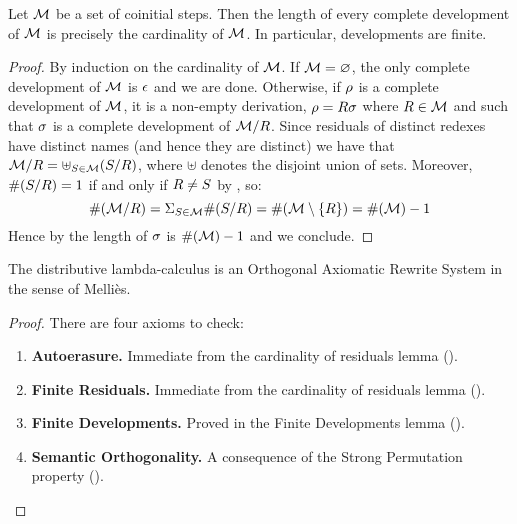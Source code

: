 \begin{lemma}
Let $\mathcal{M}$ be a set of coinitial steps.
Then the length of every complete development of $\mathcal{M}$
is precisely the cardinality of $\mathcal{M}$.
In particular, developments are finite.
\end{lemma}
\begin{proof}
By induction on the cardinality of $\mathcal{M}$.
If $\mathcal{M} = \varnothing$, the only complete development of $\mathcal{M}$ is $\epsilon$ and we are done.
Otherwise, if $\rho$ is a complete development of $\mathcal{M}$, it is a non-empty derivation, \ie
$\rho = R\sigma$
where $R \in \mathcal{M}$
and such that $\sigma$ is a complete development of $\mathcal{M}/R$.
Since residuals of distinct redexes have distinct names (and hence they are distinct)
we have that
$
  \mathcal{M}/R = \uplus_{S \in \mathcal{M}} (S/R)
$,
where $\uplus$ denotes the disjoint union of sets.
Moreover, $\#(S/R) = 1$ if and only if $R \neq S$
by , so:
\[
  \#(\mathcal{M}/R) =
  \Sigma_{S \in \mathcal{M}} \#(S/R) =
  \#(\mathcal{M} \setminus \{R\}) =
  \#(\mathcal{M}) - 1
\]
Hence by \ih the length of $\sigma$ is $\#(\mathcal{M}) - 1$
and we conclude.
\end{proof}

\begin{proposition}
The distributive lambda-calculus is an Orthogonal Axiomatic Rewrite System
in the sense of Melli\`es.
\end{proposition}
\begin{proof}
There are four axioms to check:
\begin{enumerate}
\item {\bf Autoerasure.}
  Immediate from the cardinality of residuals lemma ().
\item {\bf Finite Residuals.}
  Immediate from the cardinality of residuals lemma ().
\item {\bf Finite Developments.}
  Proved in the Finite Developments lemma ().
\item {\bf Semantic Orthogonality.}
  A consequence of the Strong Permutation property ().
\end{enumerate}
\end{proof}



